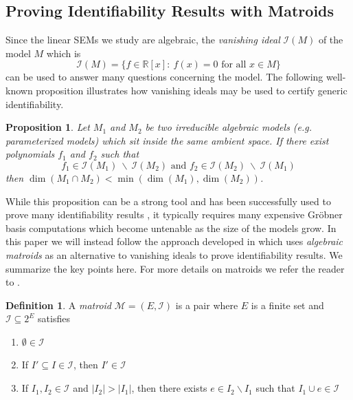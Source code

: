 \documentclass[12pt,reqno]{amsart}
\theoremstyle{plain}
\newtheorem{proposition}[theorem]{Proposition}
\theoremstyle{definition}
\newtheorem{definition}[theorem]{Definition}
\begin{document}

\subsection{Proving Identifiability Results with Matroids}\label{sec2.3}
Since the linear SEMs we study are algebraic, the \emph{vanishing ideal} $\mathcal{I}(M)$ of the model $M$ which is
\[
\mathcal{I}(M)=\{f\in\mathbb{R}[x]:\ f(x)=0 \text{ for all } x\in M \} 
\]
can be used to answer many questions concerning the model. The following well-known proposition illustrates how vanishing ideals may be used to certify generic identifiability. 
\begin{proposition}\label{polyid}
\cite[Proposition 16.1.12]{ASseth} 
Let $M_1$ and $M_2$ be two irreducible algebraic models (e.g. parameterized models) which sit inside the same ambient space. If there exist polynomials $f_1$ and $f_2$ such that
$$
f_1\in\mathcal{I}(M_1)\ \backslash\ \mathcal{I}(M_2) \text{ and } f_2\in\mathcal{I}(M_2)\ \backslash\ \mathcal{I}(M_1) 
$$
then $\dim(M_1\cap M_2) <\min(\dim(M_1),\dim(M_2))$.
\end{proposition}
While this proposition can be a strong tool and has been successfully used to prove many identifiability results \cite{allman2010identifiability, gross2021distinguishing}, it typically requires many expensive Gr\"obner basis computations which become untenable as the size of the models grow. In this paper we will instead follow the approach developed in \cite{Seth19M}
which uses \emph{algebraic matroids} as an alternative to vanishing ideals to prove identifiability results. We summarize the key points here. For more details on matroids we refer the reader to \cite{oxleyMatroidTheory92}.

\begin{definition}
A \emph{matroid} $\mathcal{M}=(E,\mathcal{I})$ is a pair where $E$ is a finite set and $\mathcal{I}\subseteq 2^E$ satisfies
\begin{enumerate}[{\rm (1)}]
\item $\emptyset\in \mathcal{I}$
\item If $I'\subseteq I \in \mathcal{I}$, then $I'\in\mathcal{I}$
\item If $I_1, I_2\in\mathcal{I}$ and $|I_2|>|I_1|$, then there exists $e\in I_2\backslash I_1$ such that $I_1\cup e\in\mathcal{I}$
\end{enumerate}
\end{definition}
\end{document}
